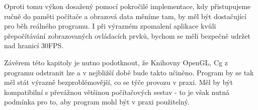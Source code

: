 Oproti tomu výkon dosažený pomocí pokročilé implementace, kdy přistupujeme ručně do paměti počítače a obrazová data měníme tam, by měl být dostačující pro běh reálného programu. I při výrazném zpomalení aplikace kvůli přepočítávání zobrazovaných ovládacích prvků, bychom se měli bezpečně udržet nad hranicí 30FPS.

Závěrem této kapitoly je nutno podotknout, že Knihovny OpenGL, Cg z programu odstranit lze a v nejbližší době bude takto učiněno. Program by se tak měl stát výrazně bezproblémovější, co se týče provozu v praxi. Měl by být kompatibilní s převážnou většinou počítačových sestav - to je však nutná podmínka pro to, aby program mohl být v praxi použitelný.






